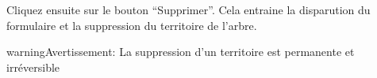 \documentclass[letterpaper,10pt,french]{sphinxmanual}
\begin{document}

Cliquez ensuite sur le bouton ``Supprimer''. Cela entraine la
disparution du formulaire et la suppression du territoire de l'arbre.

\begin{notice}{warning}{Avertissement:}
La suppression d'un territoire est permanente et irréversible
\end{notice}
\end{document}
